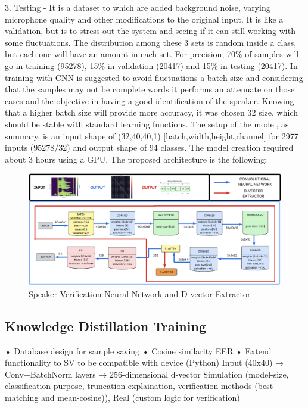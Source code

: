 3. Testing - It is a dataset to which are added background noise, varying microphone quality and other modifications to the original input. It is like a validation, but is to stress-out the system and seeing if it can still working with some fluctuations.\newline
The distribution among these 3 sets is random inside a class, but each one will have an amount in each set. For precision, 70\% of samples will go in training (95278), 15\% in validation (20417) and 15\% in testing (20417). In training with CNN is suggested to avoid fluctuations a batch size and considering that the samples may not be complete words it performs an attenuate on those cases and the objective in having a good identification of the speaker. Knowing that a higher batch size will provide more accuracy, it was chosen 32 size, which should be stable with standard learning functions.\newline
The setup of the model, as summary, is an input shape of (32,40,40,1) [batch,width,height,channel] for 2977 inputs (95278/32) and output shape of 94 classes. The model creation required about 3 hours using a GPU. The proposed architecture is the following\cite{dvector_extractor_TinySV}:
\begin{center}
    \begin{figure}[!h]
        \centering
        \includegraphics[width=1.0\textwidth]{images/3.01 D-vector Extractor.png}
        \caption{Speaker Verification Neural Network and D-vector Extractor}
    \end{figure}
\end{center}

\subsection{Knowledge Distillation Training}
• Database design for sample saving \newline
• Cosine similarity EER \newline
• Extend functionality to SV to be compatible with device (Python)\newline
Input (40x40) → Conv+BatchNorm layers → 256-dimensional d-vector \newline
Simulation (model-size, classification purpose, truncation explaination, verification methods (best-matching and mean-cosine)), Real (custom logic for verification)\newline


